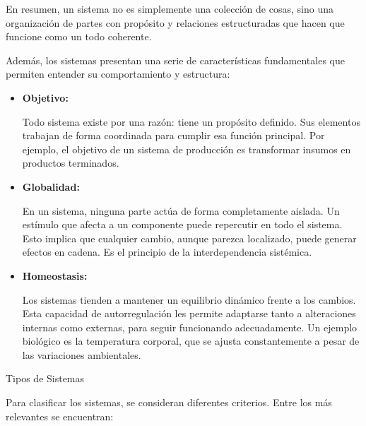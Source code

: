 \documentclass[a4paper,oneside,11pt]{article}
\begin{document}
    En resumen, un sistema no es simplemente una colección de cosas, sino una organización de partes con propósito y relaciones estructuradas que hacen que funcione como un todo coherente.
    
    Además, los sistemas presentan una serie de características fundamentales que permiten entender su comportamiento y estructura:
    
    \begin{itemize}
        \item \textbf{Objetivo:}
    
        Todo sistema existe por una razón: tiene un propósito definido. Sus elementos trabajan de forma coordinada para cumplir esa función principal. Por ejemplo, el objetivo de un sistema de producción es transformar insumos en productos terminados.
        
        \item \textbf{Globalidad:}
    
        En un sistema, \colorbox{BurntOrange}{ninguna parte actúa de forma completamente aislada.} Un estímulo que afecta a un componente puede repercutir en todo el sistema. Esto implica que cualquier cambio, aunque parezca localizado, puede generar efectos en cadena. Es el principio de la interdependencia sistémica.
        
        \item \textbf{Homeostasis:}
    
        Los sistemas tienden a mantener un equilibrio dinámico frente a los cambios. Esta capacidad de autorregulación les permite adaptarse tanto a alteraciones internas como externas, para seguir funcionando adecuadamente. Un ejemplo biológico es la temperatura corporal, que se ajusta constantemente a pesar de las variaciones ambientales.
    \end{itemize}
    
    Tipos de Sistemas
    
    Para clasificar los sistemas, se consideran diferentes criterios. Entre los más relevantes se encuentran:
    
\end{document}
